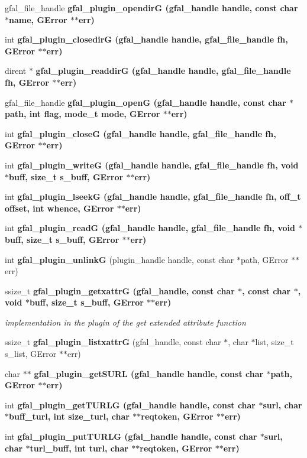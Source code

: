 \begin{CompactItemize}
gfal\_\-file\_\-handle \bf{gfal\_\-plugin\_\-opendir\-G} (gfal\_\-handle handle, const char $\ast$name, GError $\ast$$\ast$err)
\item 
int \bf{gfal\_\-plugin\_\-closedir\-G} (gfal\_\-handle handle, gfal\_\-file\_\-handle fh, GError $\ast$$\ast$err)
\item 
dirent $\ast$ \bf{gfal\_\-plugin\_\-readdir\-G} (gfal\_\-handle handle, gfal\_\-file\_\-handle fh, GError $\ast$$\ast$err)
\item 
gfal\_\-file\_\-handle \bf{gfal\_\-plugin\_\-open\-G} (gfal\_\-handle handle, const char $\ast$path, int flag, mode\_\-t mode, GError $\ast$$\ast$err)
\item 
int \bf{gfal\_\-plugin\_\-close\-G} (gfal\_\-handle handle, gfal\_\-file\_\-handle fh, GError $\ast$$\ast$err)
\item 
int \bf{gfal\_\-plugin\_\-write\-G} (gfal\_\-handle handle, gfal\_\-file\_\-handle fh, void $\ast$buff, size\_\-t s\_\-buff, GError $\ast$$\ast$err)
\item 
int \bf{gfal\_\-plugin\_\-lseek\-G} (gfal\_\-handle handle, gfal\_\-file\_\-handle fh, off\_\-t offset, int whence, GError $\ast$$\ast$err)
\item 
int \bf{gfal\_\-plugin\_\-read\-G} (gfal\_\-handle handle, gfal\_\-file\_\-handle fh, void $\ast$buff, size\_\-t s\_\-buff, GError $\ast$$\ast$err)
\item 
int \textbf{gfal\_\-plugin\_\-unlink\-G} (plugin\_\-handle handle, const char $\ast$path, GError $\ast$$\ast$err)\label{gfal__common__plugin_8h_23ee550b9dd10a5561e6c9c233fb621f}

\item 
ssize\_\-t \bf{gfal\_\-plugin\_\-getxattr\-G} (gfal\_\-handle, const char $\ast$, const char $\ast$, void $\ast$buff, size\_\-t s\_\-buff, GError $\ast$$\ast$err)\label{gfal__common__plugin_8h_e67fef2ab537815ac8ed072b179f9e67}

\begin{CompactList}\small\item\em implementation in the plugin of the get extended attribute function \item\end{CompactList}\item 
ssize\_\-t \textbf{gfal\_\-plugin\_\-listxattr\-G} (gfal\_\-handle, const char $\ast$, char $\ast$list, size\_\-t s\_\-list, GError $\ast$$\ast$err)\label{gfal__common__plugin_8h_b91265adebaddf5ca37245a0f971a303}

\item 
char $\ast$$\ast$ \bf{gfal\_\-plugin\_\-get\-SURL} (gfal\_\-handle handle, const char $\ast$path, GError $\ast$$\ast$err)
\item 
int \bf{gfal\_\-plugin\_\-get\-TURLG} (gfal\_\-handle handle, const char $\ast$surl, char $\ast$buff\_\-turl, int size\_\-turl, char $\ast$$\ast$reqtoken, GError $\ast$$\ast$err)
\item 
int \bf{gfal\_\-plugin\_\-put\-TURLG} (gfal\_\-handle handle, const char $\ast$surl, char $\ast$turl\_\-buff, int turl, char $\ast$$\ast$reqtoken, GError $\ast$$\ast$err)
\end{CompactItemize}


